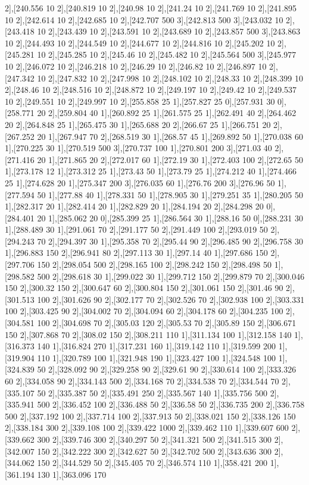 {2],[240.556 10 2],[240.819 10 2],[240.98 10 2],[241.24 10 2],[241.769 10 2],[241.895 10 2],[242.614 10 2],[242.685 10 2],[242.707 500 3],[242.813 500 3],[243.032 10 2],[243.418 10 2],[243.439 10 2],[243.591 10 2],[243.689 10 2],[243.857 500 3],[243.863 10 2],[244.493 10 2],[244.549 10 2],[244.677 10 2],[244.816 10 2],[245.202 10 2],[245.281 10 2],[245.285 10 2],[245.46 10 2],[245.482 10 2],[245.564 500 3],[245.977 10 2],[246.072 10 2],[246.218 10 2],[246.29 10 2],[246.82 10 2],[246.897 10 2],[247.342 10 2],[247.832 10 2],[247.998 10 2],[248.102 10 2],[248.33 10 2],[248.399 10 2],[248.46 10 2],[248.516 10 2],[248.872 10 2],[249.197 10 2],[249.42 10 2],[249.537 10 2],[249.551 10 2],[249.997 10 2],[255.858 25 1],[257.827 25 0],[257.931 30 0],[258.771 20 2],[259.804 40 1],[260.892 25 1],[261.575 25 1],[262.491 40 2],[264.462 20 2],[264.848 25 1],[265.475 30 1],[265.688 20 2],[266.67 25 1],[266.751 20 2],[267.252 20 1],[267.947 70 2],[268.519 30 1],[268.57 45 1],[269.892 50 1],[270.038 60 1],[270.225 30 1],[270.519 500 3],[270.737 100 1],[270.801 200 3],[271.03 40 2],[271.416 20 1],[271.865 20 2],[272.017 60 1],[272.19 30 1],[272.403 100 2],[272.65 50 1],[273.178 12 1],[273.312 25 1],[273.43 50 1],[273.79 25 1],[274.212 40 1],[274.466 25 1],[274.628 20 1],[275.347 200 3],[276.035 60 1],[276.76 200 3],[276.96 50 1],[277.594 50 1],[277.88 40 1],[278.331 50 1],[278.905 30 1],[279.251 35 1],[280.205 50 1],[282.317 20 1],[282.414 20 1],[282.829 20 1],[284.194 20 2],[284.298 20 0],[284.401 20 1],[285.062 20 0],[285.399 25 1],[286.564 30 1],[288.16 50 0],[288.231 30 1],[288.489 30 1],[291.061 70 2],[291.177 50 2],[291.449 100 2],[293.019 50 2],[294.243 70 2],[294.397 30 1],[295.358 70 2],[295.44 90 2],[296.485 90 2],[296.758 30 1],[296.883 150 2],[296.941 80 2],[297.113 30 1],[297.14 40 1],[297.686 150 2],[297.706 150 2],[298.054 500 2],[298.165 100 2],[298.242 150 2],[298.498 50 1],[298.582 500 2],[298.618 30 1],[299.022 30 1],[299.712 150 2],[299.879 70 2],[300.046 150 2],[300.32 150 2],[300.647 60 2],[300.804 150 2],[301.061 150 2],[301.46 90 2],[301.513 100 2],[301.626 90 2],[302.177 70 2],[302.526 70 2],[302.938 100 2],[303.331 100 2],[303.425 90 2],[304.002 70 2],[304.094 60 2],[304.178 60 2],[304.235 100 2],[304.581 100 2],[304.698 70 2],[305.03 120 2],[305.53 70 2],[305.89 150 2],[306.671 150 2],[307.868 70 2],[308.02 150 2],[308.211 110 1],[311.134 100 1],[312.158 140 1],[316.373 140 1],[316.824 270 1],[317.231 160 1],[319.142 110 1],[319.599 200 1],[319.904 110 1],[320.789 100 1],[321.948 190 1],[323.427 100 1],[324.548 100 1],[324.839 50 2],[328.092 90 2],[329.258 90 2],[329.61 90 2],[330.614 100 2],[333.326 60 2],[334.058 90 2],[334.143 500 2],[334.168 70 2],[334.538 70 2],[334.544 70 2],[335.107 50 2],[335.387 50 2],[335.491 250 2],[335.567 140 1],[335.756 500 2],[335.941 500 2],[336.452 100 2],[336.488 50 2],[336.58 50 2],[336.735 200 2],[336.758 500 2],[337.192 100 2],[337.714 100 2],[337.913 50 2],[338.021 150 2],[338.126 150 2],[338.184 300 2],[339.108 100 2],[339.422 1000 2],[339.462 110 1],[339.607 600 2],[339.662 300 2],[339.746 300 2],[340.297 50 2],[341.321 500 2],[341.515 300 2],[342.007 150 2],[342.222 300 2],[342.627 50 2],[342.702 500 2],[343.636 300 2],[344.062 150 2],[344.529 50 2],[345.405 70 2],[346.574 110 1],[358.421 200 1],[361.194 130 1],[363.096 170 }
